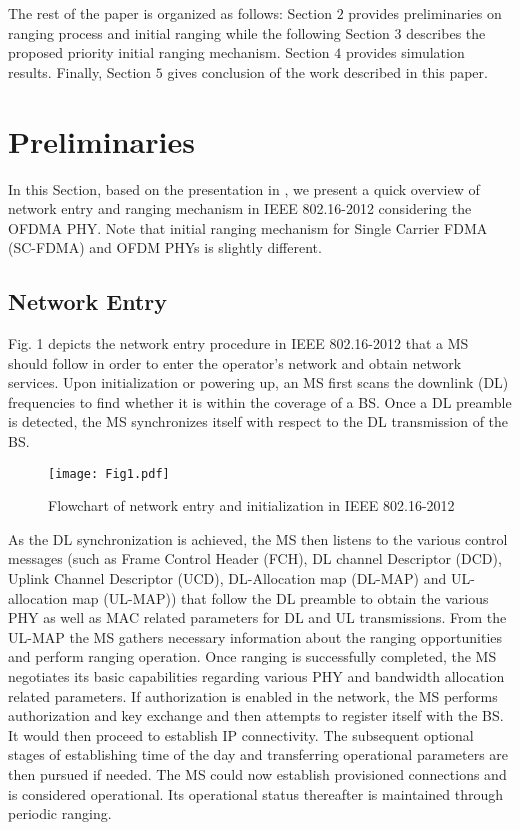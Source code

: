 \documentclass[preprint,12pt]{elsarticle}
\begin{document}
The rest of the paper is organized as follows: Section $2$ provides preliminaries on ranging process and initial ranging while the following Section $3$ describes the proposed priority initial ranging mechanism. Section $4$ provides simulation results. Finally, Section $5$ gives conclusion of the work described in this paper.

\section{Preliminaries}
In this Section, based on the presentation in \cite{Ahmadi}\cite{Taha}, we present a quick overview of network entry and ranging mechanism in IEEE 802.16-2012 considering the OFDMA PHY. Note that initial ranging mechanism for Single Carrier FDMA (SC-FDMA) and OFDM PHYs is slightly different.

\subsection{Network Entry}
Fig. 1 depicts the network entry procedure in IEEE 802.16-2012 that a MS should follow in order to enter the operator's network and obtain network services. Upon initialization or powering up, an MS first scans the downlink (DL) frequencies to find whether it is within the coverage of a BS. Once a DL preamble is detected, the MS synchronizes itself with respect to the DL transmission of the BS.

\begin{figure}[h]
\centering
\texttt{[image: Fig1.pdf]}
\centering
\caption{Flowchart of network entry and initialization in IEEE 802.16-2012 \cite{standard}}
\end{figure}

\noindent As the DL synchronization is achieved, the MS then listens to the various control messages (such as Frame Control Header (FCH), DL channel Descriptor (DCD), Uplink Channel Descriptor (UCD), DL-Allocation map (DL-MAP) and UL-allocation map (UL-MAP))  that follow the DL preamble to obtain the various PHY as well as MAC related  parameters for DL and UL transmissions. From the UL-MAP the MS gathers necessary information about the ranging opportunities and perform ranging operation. Once ranging is successfully completed, the MS negotiates its basic capabilities regarding various PHY and bandwidth allocation related parameters. If authorization is enabled in the network, the MS performs authorization and key exchange and then attempts to register itself with the BS. It would then proceed to establish IP connectivity. The subsequent optional stages of establishing time of the day and transferring operational parameters are then pursued if needed. The MS could now establish provisioned connections and is considered operational. Its operational status thereafter is maintained through periodic ranging.
\end{document}
